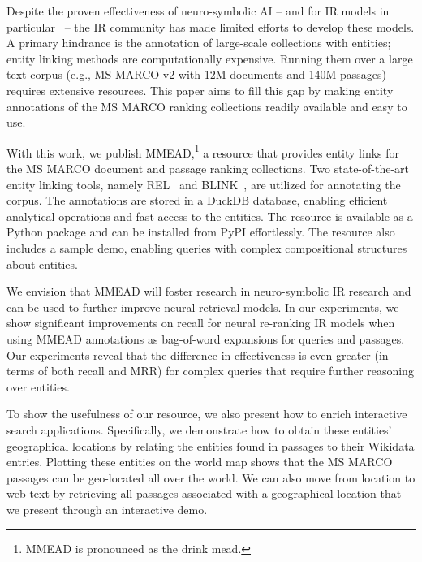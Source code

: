 Despite the proven effectiveness of neuro-symbolic AI -- and for IR models in particular~\citep{Tran:2022:DRE, Gerritse22, Chatterjee:2022:BERTER} -- the IR community has made limited efforts to develop these models. A primary hindrance is the annotation of large-scale collections with entities; entity linking methods are computationally expensive. Running them over a large text corpus (e.g., MS MARCO v2 with 12M documents and 140M passages) requires extensive resources. This paper aims to fill this gap by making entity annotations of the MS MARCO ranking collections readily available and easy to use.

With this work, we publish MMEAD,\footnote{MMEAD is pronounced as the drink mead.} a resource that provides entity links for the MS MARCO document and passage ranking collections. Two state-of-the-art entity linking tools, namely REL~\citep{rel, rebl} and BLINK~\citep{blink}, are utilized for annotating the corpus. The annotations are stored in a DuckDB database, enabling efficient analytical operations and fast access to the entities. The resource is available as a Python package and can be installed from PyPI effortlessly. The resource also includes a sample demo, enabling queries with complex compositional structures about entities. 

We envision that MMEAD will foster research in neuro-symbolic IR research and can be used to further improve neural retrieval models. In our experiments, we show significant improvements on recall for neural re-ranking IR models when using MMEAD annotations as bag-of-word expansions for queries and passages. Our experiments reveal that the difference in effectiveness is even greater (in terms of both recall and MRR) for complex queries that require further reasoning over entities.

To show the usefulness of our resource, we also present how to enrich interactive search applications. Specifically, we demonstrate how to obtain these entities' geographical locations by relating the entities found in passages to their Wikidata entries. Plotting these entities on the world map shows that the MS MARCO passages can be geo-located all over the world.
We can also move from location to web text by retrieving all passages associated with a geographical location that we present through an interactive demo.  


